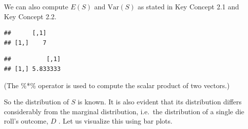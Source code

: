\documentclass[]{book}
\newenvironment{Shaded}{\begin{snugshade}}{\end{snugshade}}
\newcommand{\KeywordTok}[1]{\textcolor[rgb]{0.13,0.29,0.53}{\textbf{#1}}}
\newcommand{\DecValTok}[1]{\textcolor[rgb]{0.00,0.00,0.81}{#1}}
\newcommand{\StringTok}[1]{\textcolor[rgb]{0.31,0.60,0.02}{#1}}
\newcommand{\CommentTok}[1]{\textcolor[rgb]{0.56,0.35,0.01}{\textit{#1}}}
\newcommand{\OperatorTok}[1]{\textcolor[rgb]{0.81,0.36,0.00}{\textbf{#1}}}
\newcommand{\NormalTok}[1]{#1}
\theoremstyle{definition}
\theoremstyle{definition}
\theoremstyle{definition}
\theoremstyle{remark}
\begin{document}
We can also compute \(E(S)\) and \(\text{Var}(S)\) as stated in Key
Concept 2.1 and Key Concept 2.2.

\begin{Shaded}
\end{Shaded}

\begin{verbatim}
##      [,1]
## [1,]    7
\end{verbatim}

\begin{Shaded}
\end{Shaded}

\begin{verbatim}
##          [,1]
## [1,] 5.833333
\end{verbatim}

(The \%*\% operator is used to compute the scalar product of two
vectors.)

So the distribution of \(S\) is known. It is also evident that its
distribution differs considerably from the marginal distribution,
i.e.~the distribution of a single die roll's outcome, \(D\) . Let us
visualize this using bar plots.
\end{document}
